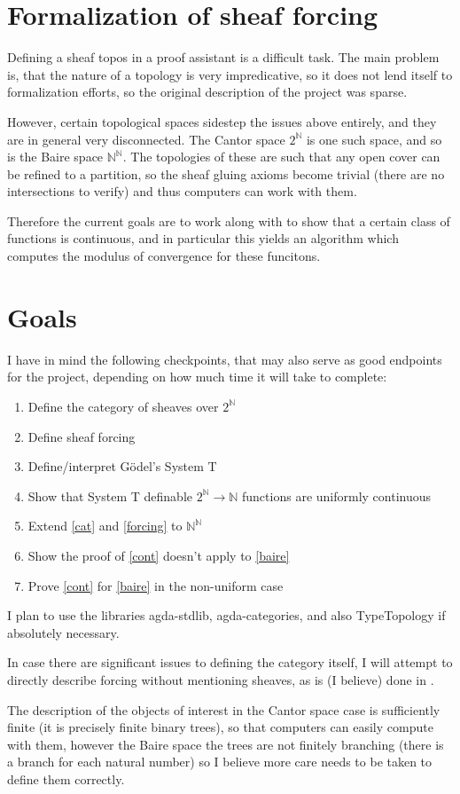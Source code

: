 \documentclass{article}
\begin{document}
\section{Formalization of sheaf forcing}
Defining a sheaf topos in a proof assistant is a difficult task.
The main problem is, that the nature of a topology is very impredicative, so it does not lend itself to formalization efforts, so the original description of the project was sparse.

However, certain topological spaces sidestep the issues above entirely, and they are in general very disconnected. The Cantor space $2^ℕ$ is one such space, and so is the Baire space $ℕ^ℕ$.
The topologies of these are such that any open cover can be refined to a partition, so the sheaf gluing axioms become trivial (there are no intersections to verify) and thus computers can work with them.

Therefore the current goals are to work along with \cite{coquand,dialogue}
to show that a certain class of functions is continuous, and in particular this
yields an algorithm which computes the modulus of convergence for these funcitons.

\section{Goals}

I have in mind the following checkpoints, that may also serve as good endpoints for the project,
depending on how much time it will take to complete:
\begin{enumerate}[(1)]
	\item\label{cat} Define the category of sheaves over $2^ℕ$
	\item\label{forcing} Define sheaf forcing
	\item\label{syst} Define/interpret Gödel's System T
	\item\label{cont} Show that System T definable $2^ℕ → ℕ$ functions are uniformly continuous
	\item\label{baire} Extend \ref{cat} and \ref{forcing} to $ℕ^ℕ$
	\item Show the proof of \ref{cont} doesn't apply to \ref{baire}
	\item Prove \ref{cont} for \ref{baire} in the non-uniform case
\end{enumerate}

I plan to use the libraries agda-stdlib\cite{stdlib}, agda-categories\cite{catlib}, and also TypeTopology\cite{tytop} if absolutely necessary.

In case there are significant issues to defining the category itself, I will attempt to directly describe forcing without mentioning sheaves, as is (I believe) done in \cite{coquand}.

The description of the objects of interest in the Cantor space case is sufficiently finite
(it is precisely finite binary trees), so that computers can easily compute with them,
however the Baire space the trees are not finitely branching (there is a branch for each natural number) so I believe more care needs to be taken to define them correctly.


\printbibliography
\end{document}
